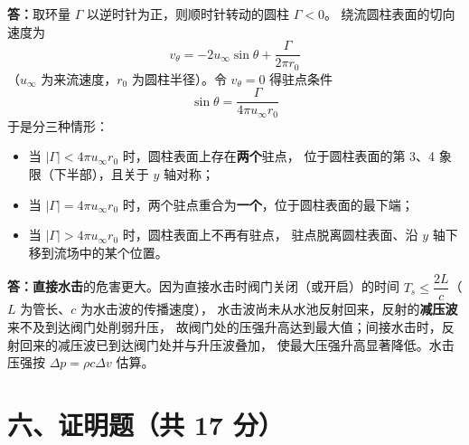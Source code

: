 
\textbf{答：}取环量 $\Gamma$ 以逆时针为正，则顺时针转动的圆柱 $\Gamma<0$。
绕流圆柱表面的切向速度为
\[
v_\theta=-2u_\infty\sin\theta+\frac{\Gamma}{2\pi r_0}
\]
（$u_\infty$ 为来流速度，$r_0$ 为圆柱半径）。令 $v_\theta=0$ 得驻点条件
\[
\sin\theta=\frac{\Gamma}{4\pi u_\infty r_0}
\]
于是分三种情形：
\begin{itemize}
  \item 当 $|\Gamma|<4\pi u_\infty r_0$ 时，圆柱表面上存在\textbf{两个}驻点，
        位于圆柱表面的第 3、4 象限（下半部），且关于 $y$ 轴对称；
  \item 当 $|\Gamma|=4\pi u_\infty r_0$ 时，两个驻点重合为\textbf{一个}，位于圆柱表面的最下端；
  \item 当 $|\Gamma|>4\pi u_\infty r_0$ 时，圆柱表面上不再有驻点，
        驻点脱离圆柱表面、沿 $y$ 轴下移到流场中的某个位置。
\end{itemize}


\textbf{答：}\textbf{直接水击}的危害更大。因为直接水击时阀门关闭（或开启）的时间
$T_s\le\dfrac{2L}{c}$（$L$ 为管长、$c$ 为水击波的传播速度），
水击波尚未从水池反射回来，反射的\textbf{减压波}来不及到达阀门处削弱升压，
故阀门处的压强升高达到最大值；间接水击时，反射回来的减压波已到达阀门处并与升压波叠加，
使最大压强升高显著降低。水击压强按 $\Delta p=\rho c\Delta v$ 估算。

\section{六、证明题（共 17 分）}


